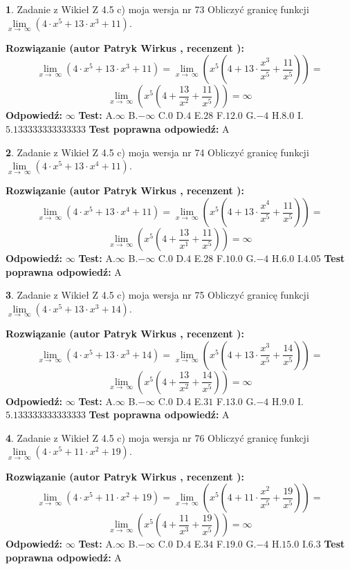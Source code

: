 \documentclass[12pt, a4paper]{article}
\theoremstyle{definition} %
\newtheorem{zad}{}
\newcommand{\zadStart}[1]{\begin{zad}#1\newline}
\newcommand{\zadStop}{\end{zad}}
\newcommand{\rozwStart}[2]{\noindent \textbf{Rozwiązanie (autor #1 , recenzent #2): }\newline}
\newcommand{\rozwStop}{\newline}
\newcommand{\odpStart}{\noindent \textbf{Odpowiedź:}\newline}
\newcommand{\odpStop}{\newline}
\newcommand{\testStart}{\noindent \textbf{Test:}\newline}
\newcommand{\testStop}{\newline}
\newcommand{\kluczStart}{\noindent \textbf{Test poprawna odpowiedź:}\newline}
\newcommand{\kluczStop}{\newline}
\begin{document}
\zadStart{Zadanie z Wikieł Z 4.5 c) moja wersja nr 73}
Obliczyć granicę funkcji  $\lim\limits_{x\to\ \infty}(4 \cdot x^{5}+13 \cdot x^{3}+11)$.
\zadStop
\rozwStart{Patryk Wirkus}{}
$$\lim\limits_{x\to\ \infty}(4 \cdot x^{5}+13 \cdot x^{3}+11) = \lim\limits_{x\to\ \infty}(x^{5}(4 +13 \cdot \frac{x^{3}}{x^{5}}+\frac{11}{x^{5}})) =$$ $$\lim\limits_{x\to\ \infty}(x^{5}(4 +\frac{13}{x^{2}}+\frac{11}{x^{5}})) =\infty$$
\rozwStop
\odpStart
$\infty$
\odpStop
\testStart
A.$\infty$ B.$-\infty$ C.$0$ D.$4$ E.$28$
F.$12.0$ G.$-4$
H.$8.0$
I.$5.133333333333333$
\testStop
\kluczStart
A
\kluczStop



\zadStart{Zadanie z Wikieł Z 4.5 c) moja wersja nr 74}
Obliczyć granicę funkcji  $\lim\limits_{x\to\ \infty}(4 \cdot x^{5}+13 \cdot x^{4}+11)$.
\zadStop
\rozwStart{Patryk Wirkus}{}
$$\lim\limits_{x\to\ \infty}(4 \cdot x^{5}+13 \cdot x^{4}+11) = \lim\limits_{x\to\ \infty}(x^{5}(4 +13 \cdot \frac{x^{4}}{x^{5}}+\frac{11}{x^{5}})) =$$ $$\lim\limits_{x\to\ \infty}(x^{5}(4 +\frac{13}{x^{1}}+\frac{11}{x^{5}})) =\infty$$
\rozwStop
\odpStart
$\infty$
\odpStop
\testStart
A.$\infty$ B.$-\infty$ C.$0$ D.$4$ E.$28$
F.$10.0$ G.$-4$
H.$6.0$
I.$4.05$
\testStop
\kluczStart
A
\kluczStop



\zadStart{Zadanie z Wikieł Z 4.5 c) moja wersja nr 75}
Obliczyć granicę funkcji  $\lim\limits_{x\to\ \infty}(4 \cdot x^{5}+13 \cdot x^{3}+14)$.
\zadStop
\rozwStart{Patryk Wirkus}{}
$$\lim\limits_{x\to\ \infty}(4 \cdot x^{5}+13 \cdot x^{3}+14) = \lim\limits_{x\to\ \infty}(x^{5}(4 +13 \cdot \frac{x^{3}}{x^{5}}+\frac{14}{x^{5}})) =$$ $$\lim\limits_{x\to\ \infty}(x^{5}(4 +\frac{13}{x^{2}}+\frac{14}{x^{5}})) =\infty$$
\rozwStop
\odpStart
$\infty$
\odpStop
\testStart
A.$\infty$ B.$-\infty$ C.$0$ D.$4$ E.$31$
F.$13.0$ G.$-4$
H.$9.0$
I.$5.133333333333333$
\testStop
\kluczStart
A
\kluczStop



\zadStart{Zadanie z Wikieł Z 4.5 c) moja wersja nr 76}
Obliczyć granicę funkcji  $\lim\limits_{x\to\ \infty}(4 \cdot x^{5}+11 \cdot x^{2}+19)$.
\zadStop
\rozwStart{Patryk Wirkus}{}
$$\lim\limits_{x\to\ \infty}(4 \cdot x^{5}+11 \cdot x^{2}+19) = \lim\limits_{x\to\ \infty}(x^{5}(4 +11 \cdot \frac{x^{2}}{x^{5}}+\frac{19}{x^{5}})) =$$ $$\lim\limits_{x\to\ \infty}(x^{5}(4 +\frac{11}{x^{3}}+\frac{19}{x^{5}})) =\infty$$
\rozwStop
\odpStart
$\infty$
\odpStop
\testStart
A.$\infty$ B.$-\infty$ C.$0$ D.$4$ E.$34$
F.$19.0$ G.$-4$
H.$15.0$
I.$6.3$
\testStop
\kluczStart
A
\kluczStop
\end{document}
